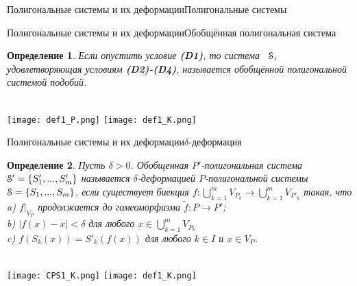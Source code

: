 \documentclass[aspectratio=1610, 10pt, notheorems]{beamer}
\newtheorem{theorem}     {Теорема}
\newtheorem{definition}  {Определение}
\begin{document}
\begin{frame}{Полигональные системы и их деформации}{Полигональные системы}
\end{frame}


\begin{frame}{Полигональные системы и их деформации}{Обобщённая полигональная система}
\begin{definition}	
Если опустить условие {\bf (D1)}, то система \ ${\EuScript S} $, удовлетворяющая условиям {\bf (D2)-(D4)},
называется  обобщённой полигональной системой подобий.
\end{definition}
\;\\
\texttt{[image: def1\_P.png]}
\hfill
\texttt{[image: def1\_K.png]}
\end{frame}


\begin{frame}{Полигональные системы и их деформации}{$\delta$-деформация}
\begin{definition}
Пусть $\delta>0$. 
Обобщенная $P'$-полигональная система ${\EuScript S}'=\{S'_1,...,S'_m\}$ называется $\delta$-деформацией $P$-полигональной системы ${\EuScript S}=\{S_1,...,S_m\}$, если существует биекция $f:\bigcup\limits_{k=1}^m V_{P_k}\to \bigcup\limits_{k=1}^m V_{P'_k}$ такая, что\\
a) $f|_{V_P}$ продолжается до гомеоморфизма $\tilde f: P\to  P'$; \\ 
b) $|f(x)-x|<\delta$  для любого $x\in \bigcup\limits_{k=1}^m V_{P_k}$\\  
c) $f(S_k(x))=S'_k(f(x))$ для любого $k\in I$ и $x\in V_P$.
\end{definition}
\;\\\qquad\qquad\qquad
\texttt{[image: CPS1\_K.png]}
\qquad\qquad\qquad
\texttt{[image: def1\_K.png]}\qquad
\end{frame}
\end{document}
